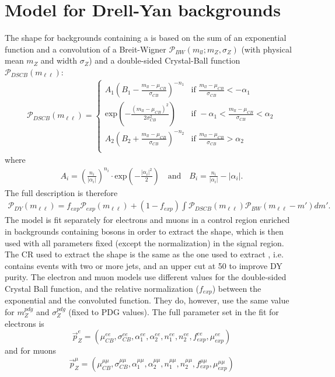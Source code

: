 \section*{Model for Drell-Yan backgrounds }
\noindent\justify
The shape for backgrounds containing a \PZ is based on the sum of an exponential function and a convolution of a Breit-Wigner $\mathcal{P}_{BW}(m_{ll};m_{Z},\sigma_{Z})$ (with physical mean $m_{Z}$ and width $\sigma_{Z}$) and a double-sided Crystal-Ball function $\mathcal{P}_{DSCB}(m_{\ell\ell})$: 
\begin{eqnarray*}
\mathcal{P}_{DSCB}(m_{\ell\ell}) = \begin{cases} A_{1} (B_{1}-\frac{m_{ll}-\mu_{CB}}{\sigma_{CB}})^{-n_{1}} &\mbox{if } \frac{m_{ll}-\mu_{CB}}{\sigma_{CB}}<-\alpha_{1} \\
\textrm{exp}\left(-\frac{(m_{ll}-\mu_{CB})^2}{2\sigma_{CB}^2}\right) &\mbox{if } -\alpha_{1}<\frac{m_{ll}-\mu_{CB}}{\sigma_{CB}}<\alpha_{2} \\
A_{2} (B_{2}+\frac{m_{ll}-\mu_{CB}}{\sigma_{CB}})^{-n_{2}} &\mbox{if } \frac{m_{ll}-\mu_{CB}}{\sigma_{CB}}>\alpha_{2} \\
\end{cases}
\end{eqnarray*}
where
\begin{eqnarray*}
A_{i} = \left(\frac{n_{i}}{|\alpha_{i}|}\right)^{n_{i}} \cdot \textrm{exp}\left(-\frac{|\alpha_{i}|^2}{2}\right) \quad \textrm{and}\quad B_{i} = \frac{n_{i}}{|\alpha_{i}|}-|\alpha_{i}| .
\end{eqnarray*}
The full description is therefore 
\begin{eqnarray*}
\mathcal{P}_{DY} (m_{\ell\ell}) = f_{exp}\mathcal{P}_{exp}(m_{\ell\ell})+(1-f_{exp})\int \mathcal{P}_{DSCB}(m_{\ell\ell})\mathcal{P}_{BW}(m_{\ell\ell}-m') dm' .
\end{eqnarray*}
The model is fit separately for electrons and muons in a control region enriched in backgrounds containing \PZ bosons in order to extract the shape, which is then used with all parameters fixed (except the normalization) in the signal region. 
The CR used to extract the shape is the same as the one used to extract \Routin, i.e. contains events with two or more jets, and an upper \ptmiss cut at 50 \GeV to improve DY purity. 
The electron and muon models use different values for the double-sided Crystal Ball function, and the relative normalization ($f_{exp}$) 
between the exponential and the convoluted function. They do, however, use the same value 
for $m_{Z}^{pdg}$ and $\sigma_{Z}^{pdg}$ (fixed to PDG values). The full parameter set in the fit for electrons is
\begin{equation*}
\vec{p}_{Z}^{e} = (\mu_{CB}^{ee}, \sigma_{CB}^{ee},\alpha_{1}^{ee},\alpha_{2}^{ee},n_{1}^{ee},n_{2}^{ee},f_{exp}^{ee},\mu_{exp}^{ee})
\end{equation*}
and for muons 
\begin{equation*}
\vec{p}_{Z}^{\mu} = (\mu_{CB}^{\mu\mu}, \sigma_{CB}^{\mu\mu},\alpha_{1}^{\mu\mu},\alpha_{2}^{\mu\mu},n_{1}^{\mu\mu},n_{2}^{\mu\mu},f_{exp}^{\mu\mu},\mu_{exp}^{\mu\mu})
\end{equation*}

